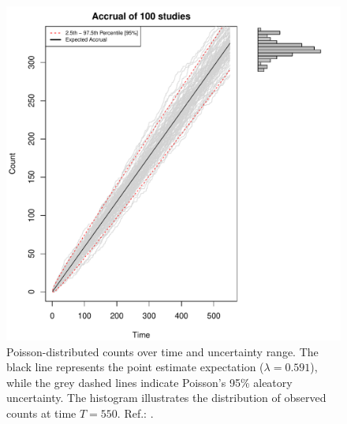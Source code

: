 \begin{figure}
\begin{knitrout}
\color{fgcolor}

{\centering \includegraphics[width=\textwidth-3cm]{figure/ch02_figunnamed-chunk-3-1} 

}


\end{knitrout}
  \caption{Poisson-distributed counts over time and uncertainty range. The black line represents the point estimate expectation ($\lambda = 0.591$), while the grey dashed lines indicate Poisson's 95\% aleatory uncertainty. The histogram illustrates the distribution of observed counts at time $T = 550$. Ref.: \cite{spiegelhalter2011visualizing}.}
  \label{fig:2_2}
\end{figure}


